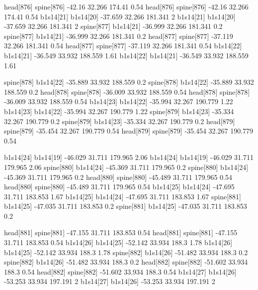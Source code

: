 head[876]    spine[876]    -42.16    32.266    174.41    0.54
head[876]    spine[876]    -42.16    32.266    174.41    0.54
b1s14[21]    b1s14[20]    -37.659    32.266    181.341    2
b1s14[21]    b1s14[20]    -37.659    32.266    181.341    2
spine[877]    b1s14[21]    -36.999    32.266    181.341    0.2
spine[877]    b1s14[21]    -36.999    32.266    181.341    0.2
head[877]    spine[877]    -37.119    32.266    181.341    0.54
head[877]    spine[877]    -37.119    32.266    181.341    0.54
b1s14[22]    b1s14[21]    -36.549    33.932    188.559    1.61
b1s14[22]    b1s14[21]    -36.549    33.932    188.559    1.61


spine[878]    b1s14[22]    -35.889    33.932    188.559    0.2
spine[878]    b1s14[22]    -35.889    33.932    188.559    0.2
head[878]    spine[878]    -36.009    33.932    188.559    0.54
head[878]    spine[878]    -36.009    33.932    188.559    0.54
b1s14[23]    b1s14[22]    -35.994    32.267    190.779    1.22
b1s14[23]    b1s14[22]    -35.994    32.267    190.779    1.22
spine[879]    b1s14[23]    -35.334    32.267    190.779    0.2
spine[879]    b1s14[23]    -35.334    32.267    190.779    0.2
head[879]    spine[879]    -35.454    32.267    190.779    0.54
head[879]    spine[879]    -35.454    32.267    190.779    0.54


b1s14[24]    b1s14[19]    -46.029    31.711    179.965    2.06
b1s14[24]    b1s14[19]    -46.029    31.711    179.965    2.06
spine[880]    b1s14[24]    -45.369    31.711    179.965    0.2
spine[880]    b1s14[24]    -45.369    31.711    179.965    0.2
head[880]    spine[880]    -45.489    31.711    179.965    0.54
head[880]    spine[880]    -45.489    31.711    179.965    0.54
b1s14[25]    b1s14[24]    -47.695    31.711    183.853    1.67
b1s14[25]    b1s14[24]    -47.695    31.711    183.853    1.67
spine[881]    b1s14[25]    -47.035    31.711    183.853    0.2
spine[881]    b1s14[25]    -47.035    31.711    183.853    0.2


head[881]    spine[881]    -47.155    31.711    183.853    0.54
head[881]    spine[881]    -47.155    31.711    183.853    0.54
b1s14[26]    b1s14[25]    -52.142    33.934    188.3    1.78
b1s14[26]    b1s14[25]    -52.142    33.934    188.3    1.78
spine[882]    b1s14[26]    -51.482    33.934    188.3    0.2
spine[882]    b1s14[26]    -51.482    33.934    188.3    0.2
head[882]    spine[882]    -51.602    33.934    188.3    0.54
head[882]    spine[882]    -51.602    33.934    188.3    0.54
b1s14[27]    b1s14[26]    -53.253    33.934    197.191    2
b1s14[27]    b1s14[26]    -53.253    33.934    197.191    2


